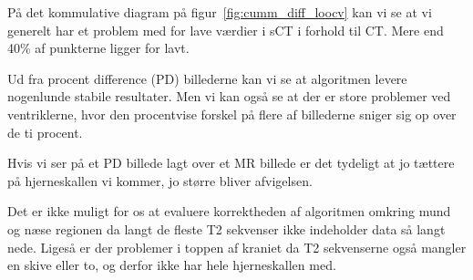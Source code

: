 På det kommulative diagram på figur~\ref{fig:cumm_diff_loocv} kan vi se at vi generelt har et problem med for lave værdier i sCT i forhold til CT. Mere end 40\% af punkterne ligger for lavt.

Ud fra procent difference (PD) billederne kan vi se at algoritmen levere nogenlunde stabile resultater. Men vi kan også se at der er store problemer ved ventriklerne, hvor den procentvise forskel på flere af billederne sniger sig op over de ti procent.

Hvis vi ser på et PD billede lagt over et MR billede er det tydeligt at jo tættere på hjerneskallen vi kommer, jo større bliver afvigelsen.

Det er ikke muligt for os at evaluere korrektheden af algoritmen omkring mund og næse regionen da langt de fleste T2 sekvenser ikke indeholder data så langt nede. Ligeså er der problemer i toppen af kraniet da T2 sekvenserne også mangler en skive eller to, og derfor ikke har hele hjerneskallen med.

